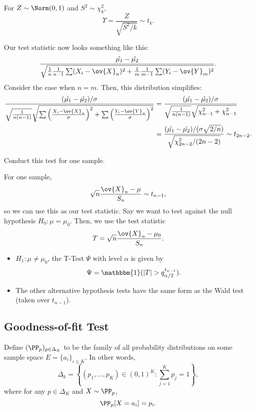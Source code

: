 \begin{definition}

For $Z\sim \Norm(0,1)$ and $S^2\sim \chi_k^2$, 
\[\Upsilon = \frac{Z}{\sqrt{S^2/k}}\sim t_k.\]
\end{definition}

Our test statistic now looks something like this:
\[\frac{\hat{\mu_1}-\hat{\mu_2}}{\sqrt{\frac{1}{n}\frac{1}{n-1}\sum(X_i-\ov{X}_n)^2 + \frac{1}{m}\frac{1}{m-1}\sum(Y_i-\ov{Y}_m)^2}}.\]
Consider the case when $n=m$. Then, this distribution simplifies:
\begin{align*}
    \frac{(\hat{\mu_1}-\hat{\mu_2})/\sigma}{\sqrt{\frac{1}{n(n-1)}}\sqrt{\sum\left(\frac{X_i-\ov{X}_n}{\sigma}\right)^2 + \sum\left(\frac{Y_i-\ov{Y}_n}{\sigma}\right)^2}} &= \frac{(\hat{\mu_1}-\hat{\mu_2})/\sigma}{\sqrt{\frac{1}{n(n-1)}}\sqrt{\chi_{n-1}^2+\chi_{n-1}^2}}\\
    &= \frac{(\hat{\mu_1}-\hat{\mu_2})/(\sigma \sqrt{2/n})}{\sqrt{\chi_{2n-2}^2/(2n-2)}}\sim t_{2n-2    }.
\end{align*}

\begin{example}
\exlabel

Conduct this test for one sample. 
\end{example}
For one sample, 
\[\sqrt{n}\frac{\ov{X}_n-\mu}{S_n}\sim t_{n-1},\]
so we can use this as our test statistic. Say we want to test against the null hypothesis $H_0: \mu=\mu_0$. Then, we use the test statistic 
\[T = \sqrt{n}\frac{\ov{X}_n-\mu_0}{S_n}.\]
\begin{itemize}
    \item $H_1: \mu\neq \mu_0$, the T-Test $\Psi$ with level $\alpha$ is given by \[\Psi = \mathbbm{1}(\vert T\vert > q_{\alpha/2}^{t_{n-1}}).\]
    \item The other alternative hypothesis tests have the same form as the Wald test (taken over $t_{n-1}$). 
\end{itemize}

\subsection{Goodness-of-fit Test}

Define $(\PP_{p})_{p\in \Delta_K}$ to be the family of all probability distributions on some sample space $E=\{a_i\}_{i\leq K}$. In other words, 
\[\Delta_k = \left\{(p_1, \hdots, p_K)\in (0,1)^K : \sum_{j=1}^K p_j=1\right\},\]
where for any $p\in \Delta_K$ and $X\sim \PP_p$, 
\[\PP_p[X=a_i]=p_i.\]

